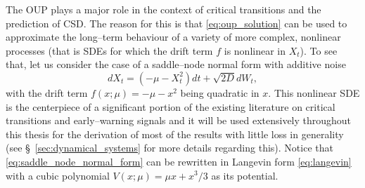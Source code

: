 The OUP plays a major role in the context of critical transitions and the prediction of CSD.  
The reason for this is that \eqref{eq:oup_solution} can be used to approximate the long--term behaviour of a variety of more complex, nonlinear processes (that is SDEs for which the drift term $f$ is nonlinear in $X_t$).
To see that, let us consider the case of a saddle--node normal form with additive noise
%
\begin{equation}\label{eq:saddle_node_normal_form}
  dX_{t} = (-\mu-X_{t}^{2})dt + \sqrt{2D}dW_{t},
\end{equation}
%
with the drift term $f(x;\mu) = -\mu - x^2$ being quadratic in $x$.
This nonlinear SDE is the centerpiece of a significant portion of the existing literature on critical transitions and early--warning signals and it will be used extensively throughout this thesis for the derivation of most of the results with little loss in generality (see \S~\ref{sec:dynamical_systems} for more details regarding this).
Notice that \eqref{eq:saddle_node_normal_form} can be rewritten in Langevin form \eqref{eq:langevin} with a cubic polynomial $V(x;\mu) = \mu x + x^3/3$ as its potential.

